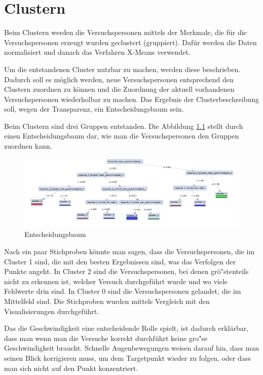 \chapter{Clustern}

Beim Clustern werden die Versuchspersonen mittels der Merkmale, die f\"ur die Versuchspersonen erzeugt wurden geclustert (gruppiert). Daf\"ur werden die Daten normalisiert und danach das Verfahren X-Means verwendet.
 
Um die entstandenen Cluster nutzbar zu machen, werden diese beschrieben. Dadurch soll es m\"oglich werden, neue Versuchspersonen entsprechend den Clustern zuordnen zu k\"onnen und die Zuordnung der aktuell vorhandenen Versuchspersonen wiederholbar zu machen. Das Ergebnis der Clusterbeschreibung soll, wegen der Transparenz, ein Entscheidungsbaum sein.

Beim Clustern sind drei Gruppen entstanden. Die Abbildung \ref{fig:EntscheidungsBaum} stellt durch einen Entscheidungsbaum dar, wie man die Versuchspersonen den Gruppen zuordnen kann.
\begin{figure}[H]
	\noindent \begin{centering}
		\includegraphics[width=15cm]{pics/EntscheidungsbaumCluster.PNG}
		\par\end{centering}
	\caption{\label{fig:EntscheidungsBaum}Entscheidungsbaum}
\end{figure}
Nach ein paar Stichproben k\"onnte man sagen, dass die Versuchspersonen, die im Cluster 1 sind, die mit den besten Ergebnissen sind, was das Verfolgen der Punkte angeht. In Cluster 2 sind die Versuchspersonen, bei denen gr\"o"stenteils nicht zu erkennen ist, welcher Versuch durchgef\"uhrt wurde und wo viele Fehlwerte drin sind. In Cluster 0 sind die Versuchspersonen gelandet, die im Mittelfeld sind. Die Stichproben wurden mittels Vergleich mit den Visualisierungen durchgef\"uhrt.

Das die Geschwindigkeit eine entscheidende Rolle spielt, ist dadurch erkl\"arbar, dass man wenn man die Versuche korrekt durchf\"uhrt keine gro"se Geschwindigkeit braucht. Schnelle Augenbewegungen weisen darauf hin, dass man seinen Blick korrigieren muss, um dem Targetpunkt wieder zu folgen, oder dass man sich nicht auf den Punkt konzentriert.
